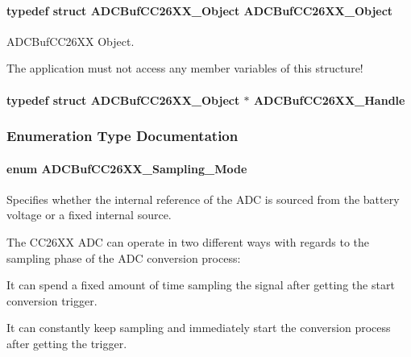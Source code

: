 \paragraph[{A\+D\+C\+Buf\+C\+C26\+X\+X\+\_\+\+Object}]{\setlength{\rightskip}{0pt plus 5cm}typedef struct {\bf A\+D\+C\+Buf\+C\+C26\+X\+X\+\_\+\+Object}  {\bf A\+D\+C\+Buf\+C\+C26\+X\+X\+\_\+\+Object}}\label{_a_d_c_buf_c_c26_x_x_8h_a7963f859847ffe0853c06219b63ceb42}


A\+D\+C\+Buf\+C\+C26\+X\+X Object. 

The application must not access any member variables of this structure! 
\paragraph[{A\+D\+C\+Buf\+C\+C26\+X\+X\+\_\+\+Handle}]{\setlength{\rightskip}{0pt plus 5cm}typedef struct {\bf A\+D\+C\+Buf\+C\+C26\+X\+X\+\_\+\+Object} $\ast$ {\bf A\+D\+C\+Buf\+C\+C26\+X\+X\+\_\+\+Handle}}\label{_a_d_c_buf_c_c26_x_x_8h_a1bd07a1b826d70701a49d7d951152504}


\subsubsection{Enumeration Type Documentation}
\paragraph[{A\+D\+C\+Buf\+C\+C26\+X\+X\+\_\+\+Sampling\+\_\+\+Mode}]{\setlength{\rightskip}{0pt plus 5cm}enum {\bf A\+D\+C\+Buf\+C\+C26\+X\+X\+\_\+\+Sampling\+\_\+\+Mode}}\label{_a_d_c_buf_c_c26_x_x_8h_a816f299f98f8fc3cc1124cda74a18d10}


Specifies whether the internal reference of the A\+D\+C is sourced from the battery voltage or a fixed internal source. 

The C\+C26\+X\+X A\+D\+C can operate in two different ways with regards to the sampling phase of the A\+D\+C conversion process\+:
\begin{DoxyItemize}
\item It can spend a fixed amount of time sampling the signal after getting the start conversion trigger.
\item It can constantly keep sampling and immediately start the conversion process after getting the trigger.
\end{DoxyItemize}

